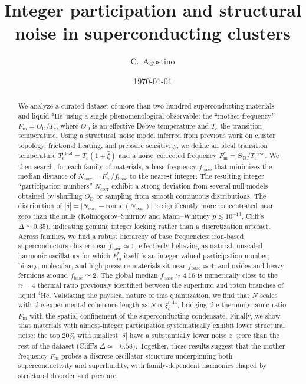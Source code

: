\documentclass[aps,prb,twocolumn,superscriptaddress,floatfix,nofootinbib]{revtex4-2}
\newcommand{\Tc}{\ensuremath{T_{\mathrm{c}}}}
\newcommand{\Tcone}{\ensuremath{{T_{\mathrm{c}}^{\mathrm{ideal}}}}}
\newcommand{\ThetaD}{\ensuremath{\Theta_{\mathrm{D}}}}
\newcommand{\Fm}{\ensuremath{F_{\mathrm{m}}}}
\newcommand{\Fmstar}{\ensuremath{{F_{\mathrm{m}}^{\ast}}}}
\newcommand{\fbase}{\ensuremath{{f_{\mathrm{base}}}}}
\newcommand{\Ncorr}{\ensuremath{{N_{\mathrm{corr}}}}}
\newcommand{\deltalock}{\ensuremath{\delta}}
\newcommand{\He}{\ensuremath{\mathrm{He}}}
\newcommand{\HeFour}{\ensuremath{{^{4}\He}}}
\begin{document}
\title{Integer participation and structural noise in superconducting clusters}

\author{C.~Agostino}

\date{\today}

\begin{abstract}
We analyze a curated dataset of more than two hundred superconducting materials
and liquid \HeFour\ using a single phenomenological observable:
the ``mother frequency'' $\Fm = \ThetaD / \Tc$,
where $\ThetaD$ is an effective Debye temperature and $\Tc$ the transition temperature.
Using a structural--noise model inferred from previous work on cluster topology, 
frictional heating, and pressure sensitivity, we define an ideal transition temperature
$\Tcone = \Tc (1 + \widehat{\xi})$ and a noise--corrected
frequency $\Fmstar = \ThetaD / \Tcone$.
We then search, for each family of materials, a base frequency
$\fbase$ that minimizes the median distance of
$N_{\mathrm{corr}} = \Fmstar / \fbase$ to the nearest integer.
The resulting integer ``participation numbers'' $N_{\mathrm{corr}}$ exhibit
a strong deviation from several null models obtained by shuffling $\ThetaD$ 
or sampling from smooth continuous distributions.
The distribution of $|\deltalock| = |\Ncorr - \mathrm{round}(\Ncorr)|$
is significantly more concentrated near zero than the nulls
(Kolmogorov--Smirnov and Mann--Whitney $p \lesssim 10^{-13}$,
Cliff's $\Delta \simeq 0.35$),
indicating genuine integer locking rather than a discretization artefact.
Across families, we find a robust hierarchy of base frequencies:
iron-based superconductors cluster near $\fbase \simeq 1$,
effectively behaving as natural, unscaled harmonic oscillators for which
$\Fmstar$ itself is an integer-valued participation number;
binary, molecular, and high-pressure materials sit near $\fbase \simeq 4$;
and oxides and heavy fermions around $\fbase \simeq 2$.
The global median $\fbase \simeq 4.16$ is numerically close
to the $n=4$ thermal ratio previously identified between the
superfluid and roton branches of liquid \HeFour. 
Validating the physical nature of this quantization, we find that $N$ scales 
with the experimental coherence length as $N \propto \xi_0^{0.44}$, 
bridging the thermodynamic ratio $\Fm$ with the spatial confinement 
of the superconducting condensate.
Finally, we show that materials with almost-integer participation
systematically exhibit lower structural noise:
the top 20\% with smallest $|\deltalock|$ have a substantially
lower noise $z$--score than the rest of the dataset
(Cliff's $\Delta \simeq -0.58$).
Together, these results suggest that the mother frequency $\Fm$
probes a discrete oscillator structure underpinning both superconductivity
and superfluidity, with family-dependent harmonics shaped
by structural disorder and pressure.
\end{abstract}
\end{document}
